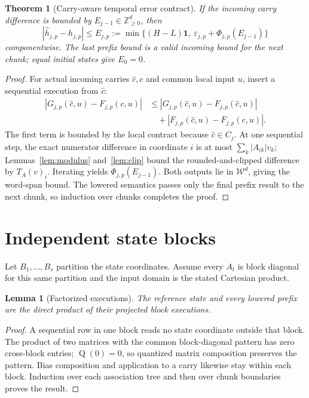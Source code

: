\documentclass[11pt]{article}
\newtheorem{lemma}[definition]{Lemma}
\newtheorem{theorem}[definition]{Theorem}
\newcommand{\Z}{\mathbb Z}
\newcommand{\W}{\mathcal W}
\newcommand{\Q}{\operatorname{Q}}
\begin{document}
\begin{theorem}[Carry-aware temporal error contract]\label{thm:temporal}
If the incoming carry difference is bounded by $E_{j-1}\in\Z_{\ge0}^d$, then
\[
 |\widehat h_{j,p}-h_{j,p}|
 \le E_{j,p}:=\min\{(H-L)\mathbf 1,\ \varepsilon_{j,p}+\Phi_{j,p}(E_{j-1})\}
\]
componentwise. The last prefix bound is a valid incoming bound for the next chunk; equal initial states give $E_0=0$.
\end{theorem}
\begin{proof}
For actual incoming carries $\widehat c,c$ and common local input $u$, insert a sequential execution from $\widehat c$:
\begin{align*}
 |G_{j,p}(\widehat c,u)-F_{j,p}(c,u)|
 &\le |G_{j,p}(\widehat c,u)-F_{j,p}(\widehat c,u)|\\
 &\quad+|F_{j,p}(\widehat c,u)-F_{j,p}(c,u)|.
\end{align*}
The first term is bounded by the local contract because $\widehat c\in C_j$. At one sequential step, the exact numerator difference in coordinate $i$ is at most $\sum_k|A_{ik}|v_k$; Lemmas~\ref{lem:modulus} and~\ref{lem:clip} bound the rounded-and-clipped difference by $T_A(v)_i$. Iterating yields $\Phi_{j,p}(E_{j-1})$. Both outputs lie in $\W^d$, giving the word-span bound. The lowered semantics passes only the final prefix result to the next chunk, so induction over chunks completes the proof.
\end{proof}

\section{Independent state blocks}
Let $B_1,\ldots,B_s$ partition the state coordinates. Assume every $A_t$ is block diagonal for this same partition and the input domain is the stated Cartesian product.

\begin{lemma}[Factorized executions]\label{lem:factor}
The reference state and every lowered prefix are the direct product of their projected block executions.
\end{lemma}
\begin{proof}
A sequential row in one block reads no state coordinate outside that block. The product of two matrices with the common block-diagonal pattern has zero cross-block entries; $\Q(0)=0$, so quantized matrix composition preserves the pattern. Bias composition and application to a carry likewise stay within each block. Induction over each association tree and then over chunk boundaries proves the result.
\end{proof}
\end{document}
